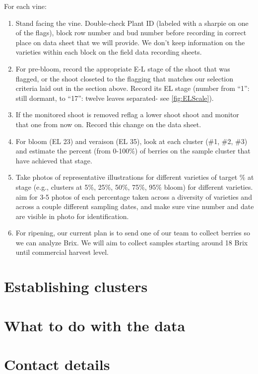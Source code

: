 \documentclass[11pt,letter]{article}
\begin{document}
For each vine:
\begin{enumerate}
	\item Stand facing the vine. Double-check Plant ID (labeled with a sharpie on one of the flags), block row number and bud number before recording in correct place on data sheet that we will provide. We don't keep information on the varieties within each block on the field data recording sheets.
	\item For pre-bloom, record the appropriate E-L stage of the shoot that was flagged, or the shoot closeted to the flagging that matches our selection criteria laid out in the section above. Record its EL stage (number from “1”: still dormant, to “17”: twelve leaves separated- see \ref{fig:ELScale}).
	\item If the monitored shoot is removed reflag a lower shoot shoot and monitor that one from now on. Record this change on the data sheet. 
	\item  For bloom (EL 23) and veraison (EL 35), look at each cluster (\#1, \#2, \#3) and estimate the percent (from 0-100\%) of berries on the sample cluster that have achieved that stage. 
	\item Take photos of representative illustrations for different varieties of target \% at stage (e.g., clusters at 5\%, 25\%, 50\%, 75\%, 95\% bloom) for different varieties. aim for 3-5 photos of each percentage taken across a diversity of varieties and across a couple different sampling dates, and make sure vine number and date are visible in photo for identification.
	\item For ripening, our current plan is to send one of our team to collect berries so we can analyze Brix. We will aim to collect samples starting around 18 Brix until commercial harvest level. 

\end{enumerate}



\section{Establishing clusters}

\section{What to do with the data}

\section{Contact details}
\end{document}
